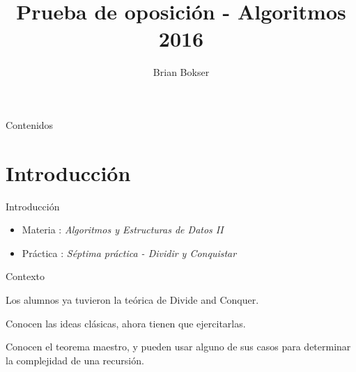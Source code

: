 \documentclass[pdf]{beamer}
\title[Prueba de oposición] %
{Prueba de oposición - Algoritmos 2016}
\author[Brian Bokser] %
{Brian Bokser}
\institute[UBA-FCEN] %
{
  Facultad de Ciencias Exactas y Naturales\\
  Universidad de Buenos Aires
}
\begin{document}
\begin{frame}
  \titlepage
\end{frame}

\begin{frame}{Contenidos}
  \tableofcontents
\end{frame}



\section{Introducci\'on}

\begin{frame}{Introducci\'on}
    \begin{itemize}
	\item Materia :  \emph{Algoritmos y Estructuras de Datos II}
	\vspace{2em}
	\item Práctica : \emph{Séptima práctica - Dividir y Conquistar}

    \end{itemize}

\end{frame}

\begin{frame}{Contexto}
    \par{Los alumnos ya tuvieron la teórica de Divide and Conquer. }
    \vspace{2em}
	
    \par{Conocen las ideas clásicas, ahora tienen que ejercitarlas.}
    \vspace{2em}
	
    \par{Conocen el teorema maestro, y pueden usar alguno de sus casos para determinar 
    la complejidad de una recursión.}
\end{frame}
\end{document}
